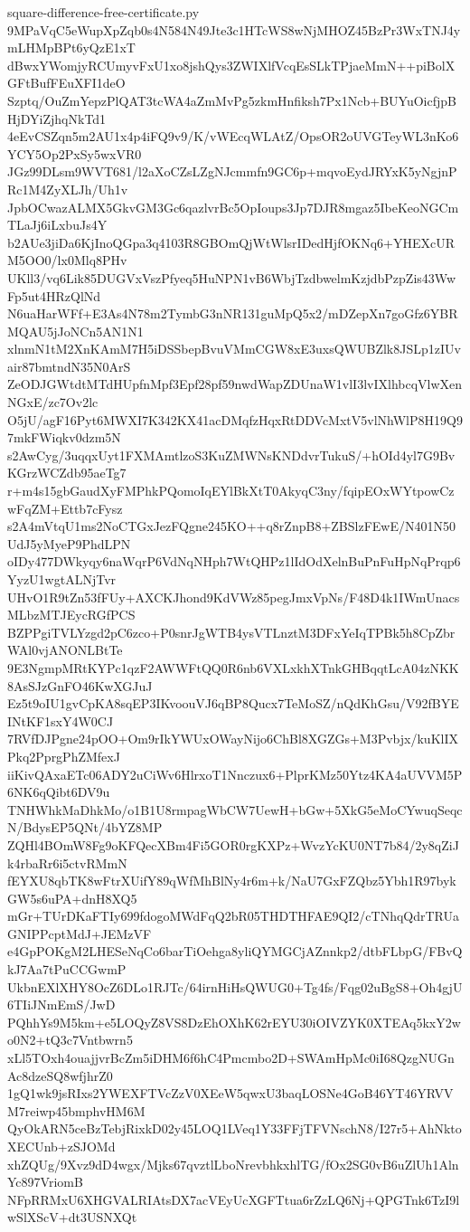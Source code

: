 \documentclass[11pt]{article}
\theoremstyle{definition}
\theoremstyle{remark}
\begin{document}
\begin{filecontents*}[overwrite]{square-difference-free-certificate.py}
9MPaVqC5eWupXpZqb0s4N584N49Jte3c1HTcWS8wNjMHOZ45BzPr3WxTNJ4ymLHMpBPt6yQzE1xT
dBwxYWomjyRCUmyvFxU1xo8jshQys3ZWIXlfVcqEsSLkTPjaeMmN++piBolXGFtBufFEuXFI1deO
Szptq/OuZmYepzPlQAT3tcWA4aZmMvPg5zkmHnfiksh7Px1Ncb+BUYuOicfjpBHjDYiZjhqNkTd1
4eEvCSZqn5m2AU1x4p4iFQ9v9/K/vWEcqWLAtZ/OpsOR2oUVGTeyWL3nKo6YCY5Op2PxSy5wxVR0
JGz99DLsm9WVT681/l2aXoCZsLZgNJcmmfn9GC6p+mqvoEydJRYxK5yNgjnPRc1M4ZyXLJh/Uh1v
JpbOCwazALMX5GkvGM3Gc6qazlvrBc5OpIoups3Jp7DJR8mgaz5IbeKeoNGCmTLaJj6iLxbuJs4Y
b2AUe3jiDa6KjInoQGpa3q4103R8GBOmQjWtWlsrIDedHjfOKNq6+YHEXcURM5OO0/lx0Mlq8PHv
UKll3/vq6Lik85DUGVxVszPfyeq5HuNPN1vB6WbjTzdbwelmKzjdbPzpZis43WwFp5ut4HRzQlNd
N6uaHarWFf+E3As4N78m2TymbG3nNR131guMpQ5x2/mDZepXn7goGfz6YBRMQAU5jJoNCn5AN1N1
xlnmN1tM2XnKAmM7H5iDSSbepBvuVMmCGW8xE3uxsQWUBZlk8JSLp1zIUvair87bmtndN35N0ArS
ZeODJGWtdtMTdHUpfnMpf3Epf28pf59nwdWapZDUnaW1vlI3lvIXlhbcqVlwXenNGxE/zc7Ov2lc
O5jU/agF16Pyt6MWXI7K342KX41acDMqfzHqxRtDDVcMxtV5vlNhWlP8H19Q97mkFWiqkv0dzm5N
s2AwCyg/3uqqxUyt1FXMAmtlzoS3KuZMWNsKNDdvrTukuS/+hOId4yl7G9BvKGrzWCZdb95aeTg7
r+m4s15gbGaudXyFMPhkPQomoIqEYlBkXtT0AkyqC3ny/fqipEOxWYtpowCzwFqZM+Ettb7cFysz
s2A4mVtqU1ms2NoCTGxJezFQgne245KO++q8rZnpB8+ZBSlzFEwE/N401N50UdJ5yMyeP9PhdLPN
oIDy477DWkyqy6naWqrP6VdNqNHph7WtQHPz1lIdOdXelnBuPnFuHpNqPrqp6YyzU1wgtALNjTvr
UHvO1R9tZn53fFUy+AXCKJhond9KdVWz85pegJmxVpNs/F48D4k1IWmUnacsMLbzMTJEycRGfPCS
BZPPgiTVLYzgd2pC6zco+P0snrJgWTB4ysVTLnztM3DFxYeIqTPBk5h8CpZbrWAl0vjANONLBtTe
9E3NgmpMRtKYPc1qzF2AWWFtQQ0R6nb6VXLxkhXTnkGHBqqtLcA04zNKK8AsSJzGnFO46KwXGJuJ
Ez5t9oIU1gvCpKA8sqEP3IKvoouVJ6qBP8Qucx7TeMoSZ/nQdKhGsu/V92fBYEINtKF1sxY4W0CJ
7RVfDJPgne24pOO+Om9rIkYWUxOWayNijo6ChBl8XGZGs+M3Pvbjx/kuKlIXPkq2PprgPhZMfexJ
iiKivQAxaETc06ADY2uCiWv6HlrxoT1Nnczux6+PlprKMz50Ytz4KA4aUVVM5P6NK6qQibt6DV9u
TNHWhkMaDhkMo/o1B1U8rmpagWbCW7UewH+bGw+5XkG5eMoCYwuqSeqcN/BdysEP5QNt/4bYZ8MP
ZQHl4BOmW8Fg9oKFQecXBm4Fi5GOR0rgKXPz+WvzYcKU0NT7b84/2y8qZiJk4rbaRr6i5ctvRMmN
fEYXU8qbTK8wFtrXUifY89qWfMhBlNy4r6m+k/NaU7GxFZQbz5Ybh1R97bykGW5s6uPA+dnH8XQ5
mGr+TUrDKaFTIy699fdogoMWdFqQ2bR05THDTHFAE9QI2/cTNhqQdrTRUaGNIPPcptMdJ+JEMzVF
e4GpPOKgM2LHESeNqCo6barTiOehga8yliQYMGCjAZnnkp2/dtbFLbpG/FBvQkJ7Aa7tPuCCGwmP
UkbnEXlXHY8OcZ6DLo1RJTc/64irnHiHsQWUG0+Tg4fs/Fqg02uBgS8+Oh4gjU6TIiJNmEmS/JwD
PQhhYs9M5km+e5LOQyZ8VS8DzEhOXhK62rEYU30iOIVZYK0XTEAq5kxY2wo0N2+tQ3c7Vntbwrn5
xLl5TOxh4ouajjvrBcZm5iDHM6f6hC4Pmcmbo2D+SWAmHpMc0iI68QzgNUGnAc8dzeSQ8wfjhrZ0
1gQ1wk9jsRIxs2YWEXFTVcZzV0XEeW5qwxU3baqLOSNe4GoB46YT46YRVVM7reiwp45bmphvHM6M
QyOkARN5ceBzTebjRixkD02y45LOQ1LVeq1Y33FFjTFVNschN8/I27r5+AhNktoXECUnb+zSJOMd
xhZQUg/9Xvz9dD4wgx/Mjks67qvztlLboNrevbhkxhlTG/fOx2SG0vB6uZlUh1AlnYc897VriomB
NFpRRMxU6XHGVALRIAtsDX7acVEyUcXGFTtua6rZzLQ6Nj+QPGTnk6TzI9lwSlXScV+dt3USNXQt

\end{filecontents*}
\end{document}
